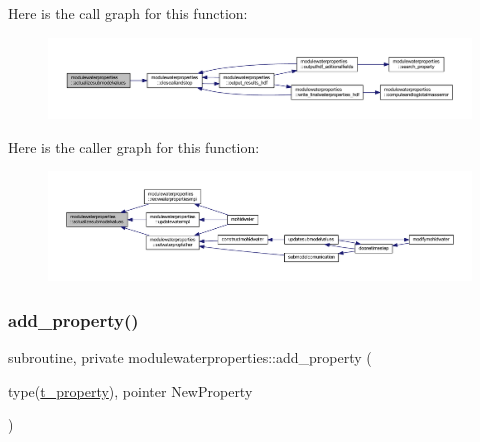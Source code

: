 Here is the call graph for this function\+:\nopagebreak
\begin{figure}[H]
\begin{center}
\leavevmode
\includegraphics[width=350pt]{namespacemodulewaterproperties_a1c0bebcf1f9e3c75094930d29edfdcca_cgraph}
\end{center}
\end{figure}
Here is the caller graph for this function\+:\nopagebreak
\begin{figure}[H]
\begin{center}
\leavevmode
\includegraphics[width=350pt]{namespacemodulewaterproperties_a1c0bebcf1f9e3c75094930d29edfdcca_icgraph}
\end{center}
\end{figure}
\mbox{\label{namespacemodulewaterproperties_ac86532460470d9c3746a9645ede24903}} 
\subsubsection{\texorpdfstring{add\+\_\+property()}{add\_property()}}
{\footnotesize\ttfamily subroutine, private modulewaterproperties\+::add\+\_\+property (\begin{DoxyParamCaption}\item[{type(\mbox{\hyperlink{structmodulewaterproperties_1_1t__property}{t\+\_\+property}}), pointer}]{New\+Property }\end{DoxyParamCaption})\hspace{0.3cm}{\ttfamily [private]}}

